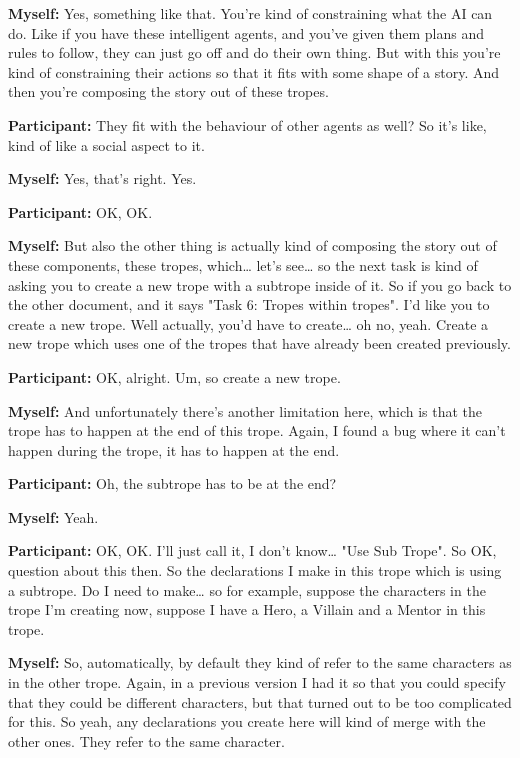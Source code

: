 \documentclass[11pt]{report}
\begin{document}
\begin{linenumbers}
\textbf{Myself:} Yes, something like that. You're kind of constraining what the AI can do. Like if you have these intelligent agents, and you've given them plans and rules to follow, they can just go off and do their own thing. But with this you're kind of constraining their actions so that it fits with some shape of a story. And then you're composing the story out of these tropes.

\textbf{Participant:} They fit with the behaviour of other agents as well? So it's like, kind of like a social aspect to it.

\textbf{Myself:} Yes, that's right. Yes.

\textbf{Participant:} OK, OK.

\textbf{Myself:} But also the other thing is actually kind of composing the story out of these components, these tropes, which\ldots{} let's see\ldots{} so the next task is kind of asking you to create a new trope with a subtrope inside of it. So if you go back to the other document, and it says "Task 6: Tropes within tropes". I'd like you to create a new trope. Well actually, you'd have to create\ldots{} oh no, yeah. Create a new trope which uses one of the tropes that have already been created previously.

\textbf{Participant:} OK, alright. Um, so create a new trope.

\textbf{Myself:} And unfortunately there's another limitation here, which is
that the trope has to happen at the end of this trope. Again, I found a bug
where it can't happen during the trope, it has to happen at the
end.

\textbf{Participant:} Oh, the subtrope has to be at the end?

\textbf{Myself:} Yeah.

\textbf{Participant:} OK, OK. I'll just call it, I don't know\ldots{} "Use Sub Trope". So OK, question about this then. So the declarations I make in this trope which is using a subtrope. Do I need to make\ldots{} so for example, suppose the characters in the trope I'm creating now, suppose I have a Hero, a Villain and a Mentor in this trope.

\textbf{Myself:} So, automatically, by default they kind of refer to the same characters as in the other trope. Again, in a previous version I had it so that you could specify that they could be different characters, but that turned out to be too complicated for this. So yeah, any declarations you create here will kind of merge with the other ones. They refer to the same character.


\end{linenumbers}
\end{document}

